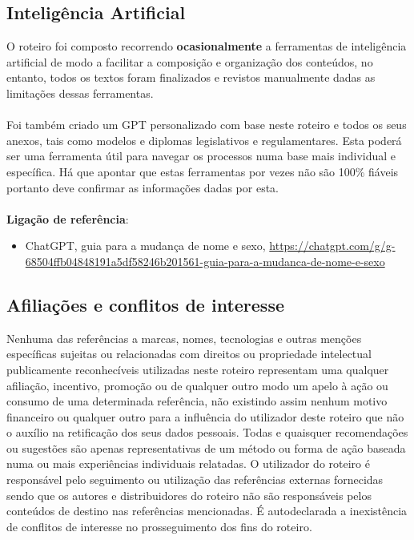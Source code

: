 \newpage

\subsection{Inteligência Artificial}
 
O roteiro foi composto recorrendo \textbf{ocasionalmente} a ferramentas
de inteligência artificial de modo a facilitar a composição e
organização dos conteúdos, no entanto, todos os textos foram finalizados
e revistos manualmente dadas as limitações dessas ferramentas. \\
\\
Foi também criado um GPT personalizado com base neste roteiro e todos os
seus anexos, tais como modelos e diplomas legislativos e regulamentares.
Esta poderá ser uma ferramenta útil para navegar os processos numa base
mais individual e específica. Há que apontar que estas ferramentas por
vezes não são 100\% fiáveis portanto deve confirmar as informações dadas
por esta. \\
\\
\textbf{Ligação de referência}:
\begin{itemize}
	\item ChatGPT, guia para a mudança de nome e sexo, \url{https://chatgpt.com/g/g-68504ffb04848191a5df58246b201561-guia-para-a-mudanca-de-nome-e-sexo}
\end{itemize}

\subsection{Afiliações e conflitos de interesse}

Nenhuma das referências a marcas, nomes, tecnologias e outras menções
específicas sujeitas ou relacionadas com direitos ou propriedade
intelectual publicamente reconhecíveis utilizadas neste roteiro
representam uma qualquer afiliação, incentivo, promoção ou de qualquer
outro modo um apelo à ação ou consumo de uma determinada referência, não
existindo assim nenhum motivo financeiro ou qualquer outro para a
influência do utilizador deste roteiro que não o auxílio na retificação
dos seus dados pessoais. Todas e quaisquer recomendações ou sugestões
são apenas representativas de um método ou forma de ação baseada numa ou
mais experiências individuais relatadas. O utilizador do roteiro é
responsável pelo seguimento ou utilização das referências externas
fornecidas sendo que os autores e distribuidores do roteiro não são
responsáveis pelos conteúdos de destino nas referências mencionadas. É
autodeclarada a inexistência de conflitos de interesse no prosseguimento
dos fins do roteiro.

